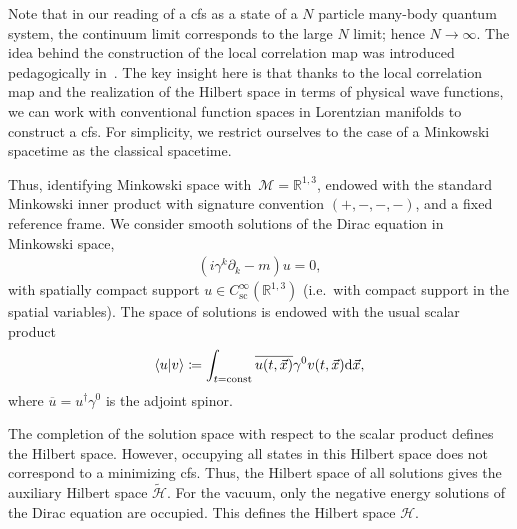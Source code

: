 \documentclass[reqno,11pt]{amsart}
\newcommand{\defeq}{\coloneqq}
\newcommand{\diracad}[1]{\overline{#1}}
\newcommand{\R}{\mathbb{R}}
\renewcommand{\H}{\mathcal{H}}
\numberwithin{equation}{section}
\begin{document}
Note that in our reading of a \ac{cfs} as a state of a $N$ particle many-body quantum system, the continuum limit corresponds
to the large $N$ limit; hence $N \to \infty$.
The idea behind the construction of the local correlation map was introduced pedagogically in~\cite{mmt-cfs, Finster2024}.
The key insight here is that thanks to the local correlation map and the realization of the Hilbert space in terms of
physical wave functions, we can work with conventional function spaces in Lorentzian manifolds to construct a \ac{cfs}.
For simplicity, we restrict ourselves to the case of a Minkowski spacetime as the classical spacetime.

Thus, identifying Minkowski space with~$\mathcal{M} = \R^{1,3}$, endowed with the standard Minkowski inner product with signature
convention $(+,-,-,-)$, and a fixed reference frame.
We consider smooth solutions of the Dirac equation in Minkowski space,
\begin{align*}
    \left(i \gamma^k \partial_k - m\right) u = 0,
\end{align*}
with spatially compact support $u \in C_{\text{sc}}^\infty(\R^{1,3})$ (i.e.~with compact support in the spatial variables).
The space of solutions is endowed with the usual scalar product
\begin{align*}
    \braket{u}{v} \defeq \int_{t=\text{const}} \diracad{u(t, \vec{x})} \gamma^0 v(t, \vec{x}) \dd\vec{x},
\end{align*}
where $\diracad{u} = u^\dagger\gamma^0$ is the adjoint spinor.

The completion of the solution space with respect to the scalar product defines the Hilbert space.
However, occupying all states in this Hilbert space does not correspond to a minimizing \ac{cfs}.
Thus, the Hilbert space of all solutions gives the auxiliary Hilbert space $\tilde{\H}$.
For the vacuum, only the negative energy solutions of the Dirac equation are occupied.
This defines the Hilbert space $\H$.
\end{document}
